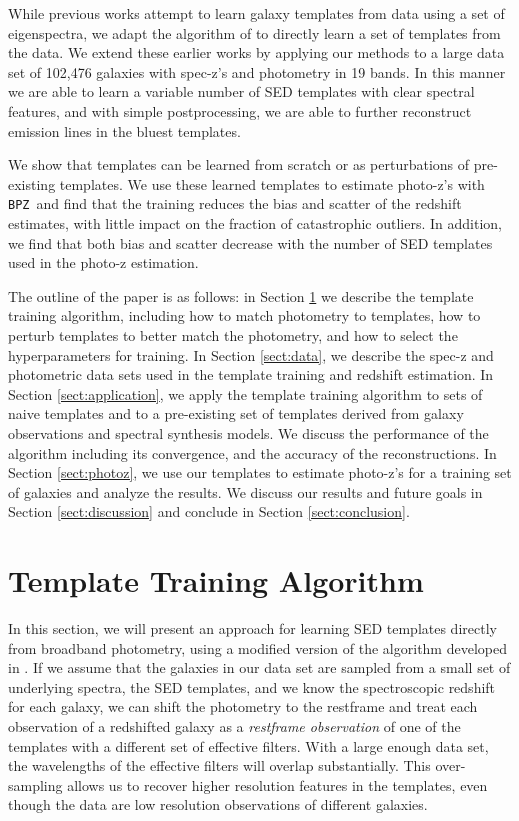 \documentclass[twocolumn]{aastex63}
\newcommand{\pzcode}[1]{\texttt{#1}}
\newcommand{\bpz}{\pzcode{BPZ}}
\begin{document}
    While previous works attempt to learn galaxy templates from data using a set of eigenspectra, we adapt the algorithm of \citet{Budavari2000b} to directly learn a set of templates from the data.%
    We extend these earlier works by applying our methods to a large data set of 102,476 galaxies with spec-z's and photometry in 19 bands.
    In this manner we are able to learn a variable number of SED templates with clear spectral features, and with simple postprocessing, we are able to further reconstruct emission lines in the bluest templates.

    We show that templates can be learned from scratch or as perturbations of pre-existing templates.
    We use these learned templates to estimate photo-z's with \bpz\ and find that the training reduces the bias and scatter of the redshift estimates, with little impact on the fraction of catastrophic outliers.
    In addition, we find that both bias and scatter decrease with the number of SED templates used in the photo-z estimation.

    The outline of the paper is as follows:
    in Section \ref{sect:template_training} we describe the template training algorithm, including how to match photometry to templates, how to perturb templates to better match the photometry, and how to select the hyperparameters for training.
    In Section \ref{sect:data}, we describe the spec-z and photometric data sets used in the template training and redshift estimation.
    In Section \ref{sect:application}, we apply the template training algorithm to sets of naive templates and to a pre-existing set of templates derived from galaxy observations and spectral synthesis models.
    We discuss the performance of the algorithm including its convergence, and the accuracy of the reconstructions.
    In Section \ref{sect:photoz}, we use our templates to estimate photo-z's for a training set of galaxies and analyze the results.
    We discuss our results and future goals in Section \ref{sect:discussion} and conclude in Section \ref{sect:conclusion}.
    
\section{Template Training Algorithm}

    \label{sect:template_training}

    In this section, we will present an approach for learning SED templates directly from broadband photometry, using a modified version of the algorithm developed in \citet{Budavari2000b}. 
    If we assume that the galaxies in our data set are sampled from a small set of underlying spectra, the SED templates, and we know the spectroscopic redshift for each galaxy, we can shift the photometry to the restframe and treat each observation of a redshifted galaxy as a \textit{restframe observation} of one of the templates with a different set of effective filters. 
    With a large enough data set, the wavelengths of the effective filters will overlap substantially. 
    This over-sampling allows us to recover higher resolution features in the templates, even though the data are low resolution observations of different galaxies.
\end{document}
